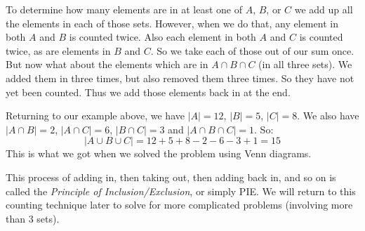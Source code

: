 \documentclass[12pt]{article}
\begin{document}
To determine how many elements are in at least one of $A$, $B$, or $C$ we add up all the elements in each of those sets.  However, when we do that, any element in both $A$ and $B$ is counted twice.  Also each element in both $A$ and $C$ is counted twice, as are elements in $B$ and $C$.  So we take each of those out of our sum once.  But now what about the elements which are in $A \cap B \cap C$ (in all three sets).  We added them in three times, but also removed them three times.  So they have not yet been counted.  Thus we add those elements back in at the end.

Returning to our example above, we have $|A| = 12$, $|B| = 5$, $|C| = 8$.  We also have $|A \cap B| = 2$, $|A \cap C| = 6$, $|B \cap C| = 3$ and $|A \cap B \cap C| = 1$.  So:
\[|A \cup B \cup C| = 12 + 5 + 8 - 2 - 6 - 3 + 1 = 15\]
This is what we got when we solved the problem using Venn diagrams.

This process of adding in, then taking out, then adding back in, and so on is called the {\em Principle of Inclusion/Exclusion}, or simply PIE.  We will return to this counting technique later to solve for more complicated problems (involving more than 3 sets).
 
 
 
\end{document}
